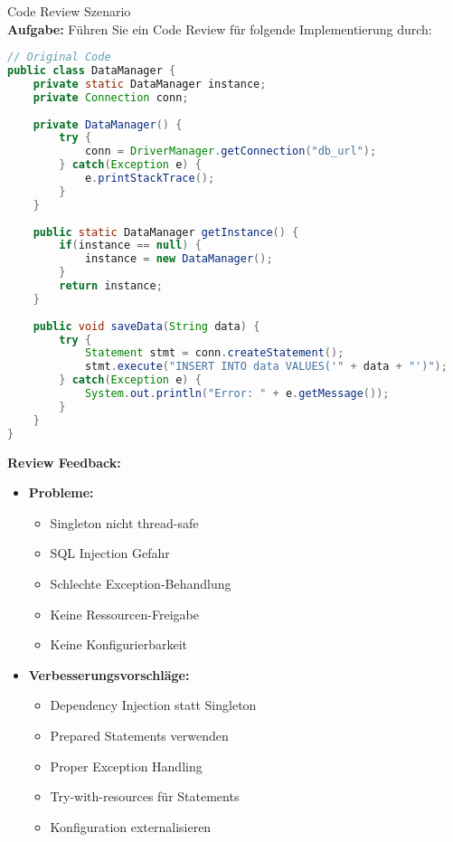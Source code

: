 \begin{example2}{Code Review Szenario}\\
\textbf{Aufgabe:} Führen Sie ein Code Review für folgende Implementierung durch:

\begin{lstlisting}[language=Java, style=base]
// Original Code
public class DataManager {
    private static DataManager instance;
    private Connection conn;
    
    private DataManager() {
        try {
            conn = DriverManager.getConnection("db_url");
        } catch(Exception e) {
            e.printStackTrace();
        }
    }
    
    public static DataManager getInstance() {
        if(instance == null) {
            instance = new DataManager();
        }
        return instance;
    }
    
    public void saveData(String data) {
        try {
            Statement stmt = conn.createStatement();
            stmt.execute("INSERT INTO data VALUES('" + data + "')");
        } catch(Exception e) {
            System.out.println("Error: " + e.getMessage());
        }
    }
}
\end{lstlisting}

\textbf{Review Feedback:}
\begin{itemize}
    \item \textbf{Probleme:}
    \begin{itemize}
        \item Singleton nicht thread-safe
        \item SQL Injection Gefahr
        \item Schlechte Exception-Behandlung
        \item Keine Ressourcen-Freigabe
        \item Keine Konfigurierbarkeit
    \end{itemize}
    
    \item \textbf{Verbesserungsvorschläge:}
    \begin{itemize}
        \item Dependency Injection statt Singleton
        \item Prepared Statements verwenden
        \item Proper Exception Handling
        \item Try-with-resources für Statements
        \item Konfiguration externalisieren
    \end{itemize}
\end{itemize}


\end{example2}
